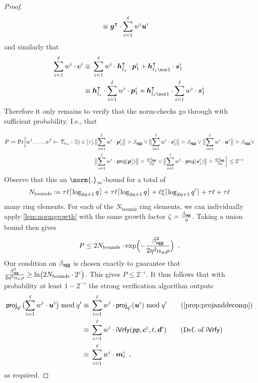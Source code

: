 \begin{proof}
\begin{align*}
  \equiv{}&\boldsymbol{g}^\intercal\cdot\sum_{i=1}^{\ell}w^i\boldsymbol{u}^i 
\end{align*}
and similarly that 
\begin{align*}
  \sum_{i=1}^{\ell}w^i\cdot \vec{c}^i \equiv{}&\sum_{i=1}^{\ell}w^i\cdot \vec{h}_{\tilde t_1}^\transpose\cdot \vec{p}_{1}^i + \vec{h}_{\tilde t_1 \xor 1}^\transpose \cdot \vec{s}_{1}^i\\
  \equiv{}&\vec{h}_{\tilde t_1}^\transpose\cdot \sum_{i=1}^{\ell}w^i\cdot \vec{p}_{1}^i + \vec{h}_{\tilde t_1 \xor 1}^\transpose \cdot \sum_{i=1}^{\ell}w^i\cdot \vec{s}_{1}^i
\end{align*}
Therefore it only remains to verify that the norm-checks go through with sufficient probability.
I.e., that

\begin{align*}
    P\coloneqq\Pr\Bigl[
      w^1,\dots,w^{\ell} \gets \mathcal{T}_{\alpha_w} :
      \exists j\in[\tau]\ldotp&
      \bigl\Vert\sum_{i=1}^{\ell}w^i\cdot \boldsymbol{p}_j^i\bigr\Vert > \beta_{\mathsf{agg}} 
      \lor 
      \bigl\Vert\sum_{i=1}^{\ell}w^i\cdot \boldsymbol{s}_j^i\bigr\Vert > \beta_{\mathsf{agg}}
      \lor
      \bigl\Vert\sum_{i=1}^{\ell}w^i\cdot\boldsymbol{u}^i\bigr\Vert > \beta_{\mathsf{agg}}
      \lor\\
      {}&
      \bigl\Vert\sum_{i=1}^{\ell}w^i\cdot\mathsf{proj}(\boldsymbol{p}_j^i)\bigr\Vert > \tfrac{q\beta_{\mathsf{agg}}}{2\eta}
      \lor
      \bigl\Vert\sum_{i=1}^{\ell}w^i\cdot\mathsf{proj}(\boldsymbol{s}_j^i)\bigr\Vert > \tfrac{q\beta_{\mathsf{agg}}}{2\eta}
    \Bigr] \leq 2^{-\varepsilon}
\end{align*}
Observe that this an $\norm{.}_\infty$-bound for a total of 
\[
  N_\textrm{bounds} \coloneqq \tau\ell \lceil\log_{2\eta+1}q\rceil + \tau\ell\lceil\log_{2\eta+1}q\rceil + \ell\xi\lceil\log_{2\eta+1}q'\rceil + \tau\ell + \tau\ell
\]
many ring elements.
For each of the $N_\textrm{bounds}$ ring elements, we can individually apply \autoref{lem:normgrowth} with the same growth factor $\zeta =\tfrac{\beta_{\mathsf{agg}}}{\eta}$.
Taking a union bound then gives
\[
 P \leq 2N_{\textrm{bounds}}\cdot \exp\Bigl(-\frac{\beta_{\mathsf{agg}}^2}{2\eta^2\alpha_w\rho}\Bigr)\enspace.
\]
Our condition on $\beta_{\mathsf{agg}}$ is chosen exactly to guarantee that $\tfrac{\beta_{\mathsf{agg}}^2}{2\eta^2\alpha_w\rho} \geq \ln\bigl(2N_{\textrm{bounds}}\cdot 2^\varepsilon \bigr)$.
This gives $P\leq 2^{-\varepsilon}$.
It thus follows that with probability at least $1-2^{-\varepsilon}$ the strong verification algorithm outputs
  \begin{align*}
    \proj_{q'}\bigl(\sum_{i=1}^{\ell}w^i \cdot \vec{u}^i\bigr) \bmod q'
    \equiv{}&\sum_{i=1}^{\ell}w^i \cdot \proj_{q'}(\vec{u}^i) \bmod q'\tag{\autoref{prop:projanddecomp}}\\
    \equiv{}&\sum_{i=1}^{\ell}w^i \cdot \iverify(\params,\vec{c}^i,t,\vec{d}^i)\tag{Def.\ of $\iverify$}\\
    \equiv{}&\sum_{i=1}^{\ell}w^i \cdot \vec{m}_t^i\enspace,
  \end{align*}
  as required.


\end{proof}
